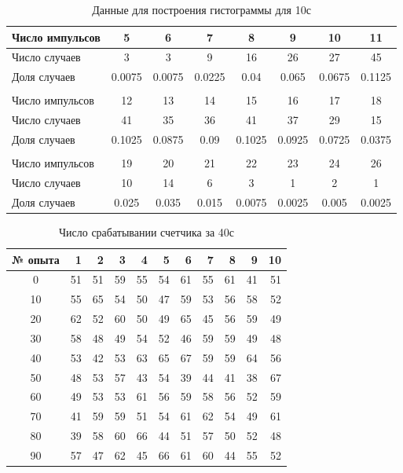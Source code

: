 \documentclass[a4paper, 12pt]{article}
\begin{document}
    \begin{table}[H]
    \begin{center}
    \begin{tabular}{|l|c|c|c|c|c|c|c|}\hline
    Число импульсов & 5 & 6 & 7 & 8 & 9 & 10 & 11  \\\hline
    Число случаев & 3 & 3 & 9 & 16 & 26 & 27 & 45 \\\hline
    Доля случаев & 0.0075 & 0.0075 & 0.0225 & 0.04 & 0.065 & 0.0675 & 0.1125 \\\hline
    \multicolumn{8}{c}{}\\\hline
    Число импульсов & 12 & 13 & 14 & 15 & 16 & 17 & 18 \\\hline
    Число случаев & 41 & 35 & 36 & 41 & 37 & 29 & 15 \\\hline
    Доля случаев & 0.1025 & 0.0875 & 0.09 & 0.1025 & 0.0925 & 0.0725 & 0.0375 \\\hline
    \multicolumn{8}{c}{}\\\hline
    Число импульсов & 19 & 20 & 21 & 22 & 23 & 24 & 26  \\\hline
    Число случаев & 10 & 14 & 6 & 3 & 1 & 2 & 1  \\\hline
    Доля случаев & 0.025 & 0.035 & 0.015 & 0.0075 & 0.0025 & 0.005 & 0.0025  \\\hline
    \end{tabular}
    \caption{Данные для построения гистограммы для 10с}
    \end{center}
    \end{table}
    \newpage

    \begin{table}[H]
    \begin{center}
    \begin{tabular}{|c|r|r|r|r|r|r|r|r|r|r|}
    \hline
    {№ опыта} &   1 &   2 &   3 &   4 &   5 &   6 &   7 &   8 &   9 &  10 \\
    \hline
    0 & 51 & 51 & 59 & 55 & 54 & 61 & 55 & 61 & 41 & 51 \\
    10 & 55 & 65 & 54 & 50 & 47 & 59 & 53 & 56 & 58 & 52 \\
    20 & 62 & 52 & 60 & 50 & 49 & 65 & 45 & 56 & 59 & 49 \\
    30 & 58 & 48 & 49 & 54 & 52 & 46 & 59 & 59 & 49 & 48 \\
    40 & 53 & 42 & 53 & 63 & 65 & 67 & 59 & 59 & 64 & 56 \\
    50 & 48 & 53 & 57 & 43 & 54 & 39 & 44 & 41 & 38 & 67 \\
    60 & 49 & 53 & 53 & 61 & 56 & 59 & 58 & 56 & 52 & 59 \\
    70 & 41 & 59 & 59 & 51 & 54 & 61 & 62 & 54 & 49 & 61 \\
    80 & 39 & 58 & 60 & 66 & 44 & 51 & 57 & 50 & 52 & 48 \\
    90 & 57 & 47 & 62 & 45 & 66 & 61 & 60 & 44 & 55 & 52 \\
    \hline
    \end{tabular}
    \caption{Число срабатывании счетчика за 40с}
    \end{center}
    \end{table}
\end{document}
